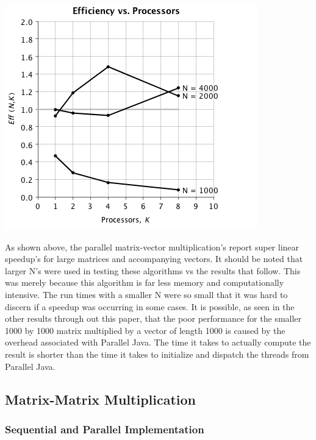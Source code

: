 \documentclass{dependencies/acm_proc_article-sp}
\begin{document}
\begin{center}
\includegraphics[scale=0.5]{images/matrix-vector/eff-vs-proc.png}
\end{center}

As shown above, the parallel matrix-vector multiplication's report super
linear speedup's for large matrices and accompanying vectors. It should be
noted that larger N's were used in testing these algorithms vs the results
that follow. This was merely because this algorithm is far less memory and
computationally intensive. The run times with a smaller N were so small that
it was hard to discern if a speedup was occurring in some cases. It is possible,
as seen in the other results through out this paper, that the poor performance
for the smaller 1000 by 1000 matrix multiplied by a vector of length 1000 is
caused by the overhead associated with Parallel Java. The time it takes to
actually compute the result is shorter than the time it takes to initialize
and dispatch the threads from Parallel Java.

\subsection{Matrix-Matrix Multiplication}

\subsubsection{Sequential and Parallel Implementation}
\end{document}
